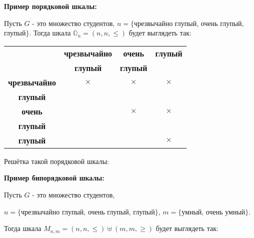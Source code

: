 \documentclass[18pt, a4paper]{extarticle}
\newcommand{\primerT}[1]{\textbf{Пример #1:\;}}
\begin{document}
\primerT{порядковой шкалы}

Пусть $G$ - это множество студентов, $n=\{$чрезвычайно глупый, очень глупый, глупый$\}$. Тогда шкала $\mathbb{O}_n=(n,n,\le)$ будет выглядеть так:

\begin{center}
\scalebox{.8}
{
\begin{tabular}{|c|c|c|c|}
\cline{1-4}
& \textbf{чрезвычайно} & \textbf{очень} & \textbf{глупый} \\
& \textbf{глупый} & \textbf{глупый} & \\
\cline{1-4}
\textbf{чрезвычайно} & $\times$ & $\times$ & $\times$ \\
\textbf{глупый} & & & \\
\cline{1-4}
\textbf{очень} & & $\times$ & $\times$ \\
\textbf{глупый} & & & \\
\cline{1-4}
\textbf{глупый} & & & $\times$ \\
\cline{1-4}
\end{tabular}
}
\end{center}

Решётка такой порядковой шкалы:

\begin{center}
\end{center}


\primerT{бипорядковой шкалы}

Пусть $G$ - это множество студентов,

$n=\{$чрезвычайно глупый, очень глупый, глупый$\}$, $m=\{$умный, очень умный$\}$.\newpage

Тогда шкала $M_{n,m}=(n,n,\le)\uplus(m,m,\ge)$ будет выглядеть так:
\end{document}
